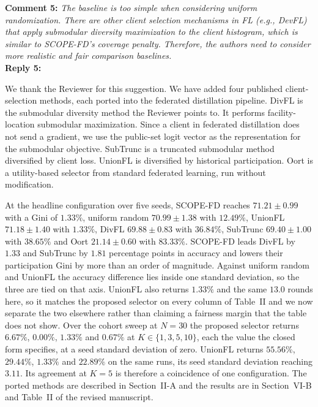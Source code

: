 \documentclass[10pt]{article}
\begin{document}
\noindent
\textbf{Comment 5:} \textit{The baseline is too simple when considering uniform randomization. There are other client selection mechanisms in FL (e.g., DevFL) that apply submodular diversity maximization to the client histogram, which is similar to SCOPE-FD's coverage penalty. Therefore, the authors need to consider more realistic and fair comparison baselines.} \\
\noindent
\textbf{Reply 5:} {We thank the Reviewer for this suggestion. We have added four published client-selection methods, each ported into the federated distillation pipeline. DivFL is the submodular diversity method the Reviewer points to. It performs facility-location submodular maximization. Since a client in federated distillation does not send a gradient, we use the public-set logit vector as the representation for the submodular objective. SubTrunc is a truncated submodular method diversified by client loss. UnionFL is diversified by historical participation. Oort is a utility-based selector from standard federated learning, run without modification.

At the headline configuration over five seeds, SCOPE-FD reaches $71.21 \pm 0.99$ with a Gini of $1.33\%$, uniform random $70.99 \pm 1.38$ with $12.49\%$, UnionFL $71.18 \pm 1.40$ with $1.33\%$, DivFL $69.88 \pm 0.83$ with $36.84\%$, SubTrunc $69.40 \pm 1.00$ with $38.65\%$ and Oort $21.14 \pm 0.60$ with $83.33\%$. SCOPE-FD leads DivFL by $1.33$ and SubTrunc by $1.81$ percentage points in accuracy and lowers their participation Gini by more than an order of magnitude. Against uniform random and UnionFL the accuracy difference lies inside one standard deviation, so the three are tied on that axis. UnionFL also returns $1.33\%$ and the same $13.0$ rounds here, so it matches the proposed selector on every column of Table~II and we now separate the two elsewhere rather than claiming a fairness margin that the table does not show. Over the cohort sweep at $N=30$ the proposed selector returns $6.67\%$, $0.00\%$, $1.33\%$ and $0.67\%$ at $K \in \{1,3,5,10\}$, each the value the closed form specifies, at a seed standard deviation of zero. UnionFL returns $55.56\%$, $29.44\%$, $1.33\%$ and $22.89\%$ on the same runs, its seed standard deviation reaching $3.11$. Its agreement at $K=5$ is therefore a coincidence of one configuration. The ported methods are described in Section~II-A and the results are in Section~VI-B and Table~II of the revised manuscript.}\\
\end{document}
